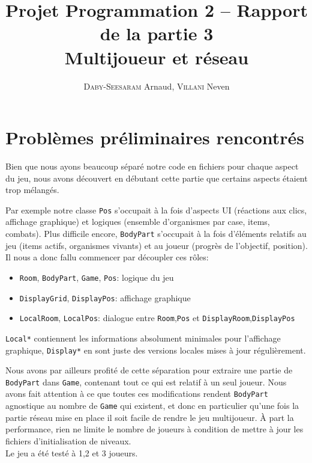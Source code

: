 \documentclass[a4paper,french]{article}
\title{Projet Programmation 2 -- Rapport de la partie 3\\Multijoueur et r\'eseau}
\author{\textsc{Daby-Seesaram} Arnaud, \textsc{Villani} Neven}
\date{}
\newcommand{\ttt}[1]{\texttt{#1}}
\begin{document}
\maketitle

\section{Probl\`emes préliminaires rencontr\'es}

Bien que nous ayons beaucoup s\'epar\'e notre code en fichiers pour chaque aspect du jeu,
nous avons d\'ecouvert en d\'ebutant cette partie que certains aspects \'etaient trop
m\'elang\'es.

Par exemple notre classe \ttt{Pos} s'occupait \`a la fois d'aspects UI (r\'eactions aux
clics, affichage graphique) et logiques (ensemble d'organismes par case, items, combats).
Plus difficile encore, \ttt{BodyPart} s'occupait \`a la fois d'\'el\'ements relatifs au
jeu (items actifs, organismes vivants) et au joueur (progr\`es de l'objectif, position).\\

Il nous a donc fallu commencer par d\'ecoupler ces r\^oles:
\begin{itemize}
    \item \ttt{Room}, \ttt{BodyPart}, \ttt{Game}, \ttt{Pos}: logique du jeu
    \item \ttt{DisplayGrid}, \ttt{DisplayPos}: affichage graphique
    \item \ttt{LocalRoom}, \ttt{LocalPos}: dialogue entre \ttt{Room},\ttt{Pos} et \ttt{DisplayRoom},\ttt{DisplayPos}
\end{itemize}

\ttt{Local*} contiennent les informations absolument minimales pour l'affichage graphique, \ttt{Display*} en sont
juste des versions locales mises \`a jour r\'eguli\`erement.

Nous avons par ailleurs profit\'e de cette s\'eparation pour extraire une partie de
\ttt{BodyPart} dans \ttt{Game}, contenant tout ce qui est relatif \`a un seul joueur.
Nous avons fait attention \`a ce que toutes ces modifications rendent \ttt{BodyPart}
agnostique au nombre de \ttt{Game} qui existent, et donc en particulier qu'une fois la
partie r\'eseau mise en place il soit facile de rendre le jeu multijoueur.
\`A part la performance, rien ne limite le nombre de joueurs \`a condition de mettre \`a
jour les fichiers d'initialisation de niveaux.\\
Le jeu a \'et\'e test\'e \`a 1,2 et 3 joueurs.\\
\end{document}
